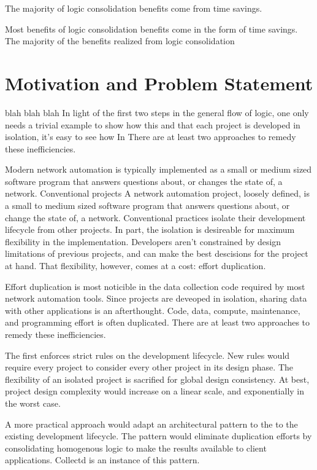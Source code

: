 The majority of logic consolidation benefits come from time savings.

Most benefits of logic consolidation benefits come in the form of time savings.
The majority of the benefits realized from logic consolidation 

\section{Motivation and Problem Statement}
\label{sec:intro:motivation}

blah blah blah
In light of the first two steps in the general flow of logic, one only needs a
trivial example to show how this and that each 
project is developed in isolation, it's easy to see how 
In 
There are at least two approaches to remedy these inefficiencies. 

Modern network automation is typically implemented as a small or medium sized
software program that answers questions about, or changes the state of, a 
network. Conventional projects 
A network automation project, loosely defined, is a small to medium sized 
software program that answers questions about, or change the state of, 
a network. Conventional practices isolate their development lifecycle
from other projects. In part, the isolation is desireable for maximum flexibility in the 
implementation. Developers aren't constrained by design limitations of previous
projects, and can make the best descisions for the project at hand. That 
flexibility, however, comes at a cost: effort duplication. 

Effort duplication is most noticible in the data collection code required 
by most network automation tools. Since projects are deveoped in isolation, 
sharing data with other applications is an afterthought. Code, data,
compute, maintenance, and programming effort is often duplicated. There are at least
two approaches to remedy these inefficiencies. 

The first enforces strict rules on the development lifecycle. New rules
would require every project to consider every other project in its design phase. 
The flexibility of an isolated project is sacrified for global design consistency.
At best, project design complexity would increase on a linear scale, and 
exponentially in the worst case.

A more practical approach would adapt an architectural pattern to the to the 
existing development lifecycle. The pattern would eliminate duplication
efforts by consolidating homogenous logic to make the results available to
client applications. Collectd is an instance of this pattern. 

